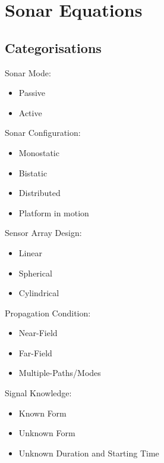 \chapter{Sonar Equations}

\section{Categorisations}
Sonar Mode:
\begin{itemize}
	\item Passive
	\item Active
\end{itemize}

Sonar Configuration:
\begin{itemize}
	\item Monostatic
	\item Bistatic
	\item Distributed
	\item Platform in motion
\end{itemize}

Sensor Array Design:
\begin{itemize}
	\item Linear
	\item Spherical
	\item Cylindrical
\end{itemize}

Propagation Condition:
\begin{itemize}
	\item Near-Field
	\item Far-Field
	\item Multiple-Paths/Modes
\end{itemize}

Signal Knowledge:
\begin{itemize}
	\item Known Form
	\item Unknown Form
	\item Unknown Duration and Starting Time
\end{itemize}
